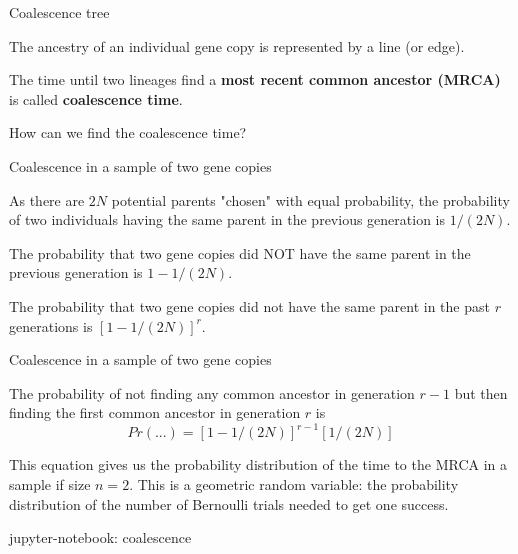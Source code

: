 \begin{frame}{Coalescence tree}

	The ancestry of an individual gene copy is represented by a line (or edge).

	\bigskip
	\begin{block}{}
	The time until two lineages find a \textbf{most recent common ancestor (MRCA)} is called \textbf{coalescence time}.
	\end{block}

	How can we find the coalescence time?

\end{frame}


\begin{frame}{Coalescence in a sample of two gene copies}

	As there are $2N$ potential parents "chosen" with equal probability, the probability of two individuals having the same
	parent in the previous generation is \pause $1/(2N)$.

	\bigskip

	The probability that two gene copies did NOT have the same parent in the previous generation is \pause $1-1/(2N)$.

	\bigskip

	The probability that two gene copies did not have the same parent in the past $r$ generations is \pause $[1-1/(2N)]^r$.

\end{frame}


\begin{frame}{Coalescence in a sample of two gene copies}

	The probability of not finding any common ancestor in generation $r-1$ but then finding the first common ancestor
	in generation $r$ is \pause
	\begin{equation}
		Pr(\texttt{...}) = [1-1/(2N)]^{r-1}[1/(2N)]
	\end{equation}

	\small

	This equation gives us the probability distribution of the time to the MRCA in a sample if size $n=2$. This is 
	a geometric random variable: the probability distribution of the number of Bernoulli trials needed to get one success.

	\bigskip
	\tiny
	jupyter-notebook: coalescence

\end{frame}


